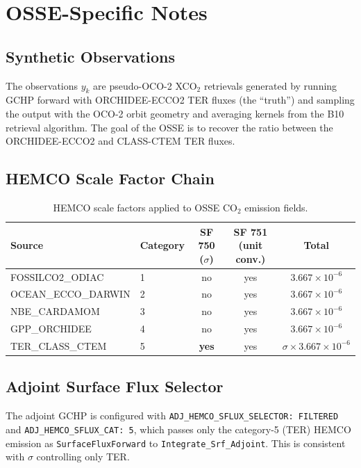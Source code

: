 \documentclass[12pt]{article}
\begin{document}
\section{OSSE-Specific Notes}

\subsection{Synthetic Observations}

The observations $y_k$ are pseudo-OCO-2 XCO$_2$ retrievals generated by
running GCHP forward with ORCHIDEE-ECCO2 TER fluxes (the ``truth'') and
sampling the output with the OCO-2 orbit geometry and averaging kernels
from the B10 retrieval algorithm. The goal of the OSSE is to recover the
ratio between the ORCHIDEE-ECCO2 and CLASS-CTEM TER fluxes.

\subsection{HEMCO Scale Factor Chain}

\begin{table}[h!]
\centering
\caption{HEMCO scale factors applied to OSSE CO$_2$ emission fields.}
\begin{tabular}{llccc}
\toprule
Source & Category & SF 750 ($\sigma$) & SF 751 (unit conv.) & Total \\
\midrule
FOSSILCO2\_ODIAC & 1 & no & yes & $3.667\times10^{-6}$ \\
OCEAN\_ECCO\_DARWIN & 2 & no & yes & $3.667\times10^{-6}$ \\
NBE\_CARDAMOM & 3 & no & yes & $3.667\times10^{-6}$ \\
GPP\_ORCHIDEE & 4 & no & yes & $3.667\times10^{-6}$ \\
TER\_CLASS\_CTEM & 5 & \textbf{yes} & yes & $\sigma \times 3.667\times10^{-6}$ \\
\bottomrule
\end{tabular}
\end{table}

\subsection{Adjoint Surface Flux Selector}

The adjoint GCHP is configured with
\texttt{ADJ\_HEMCO\_SFLUX\_SELECTOR: FILTERED} and
\texttt{ADJ\_HEMCO\_SFLUX\_CAT: 5}, which passes only the category-5 (TER)
HEMCO emission as \texttt{SurfaceFluxForward} to \texttt{Integrate\_Srf\_Adjoint}.
This is consistent with $\sigma$ controlling only TER.
\end{document}

